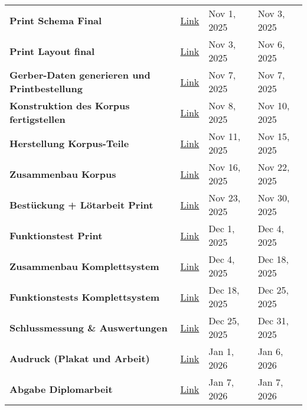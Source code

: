 \begin{table}[!ht]
\begin{tabularx}{388pt}{|l|l|l|l|}
		\textbf{Print Schema Final} & \href{https://github.com/Violabitch5/Nathophone\_elec/issues/8}{Link} & Nov 1, 2025 & Nov 3, 2025 \\ 
		\textbf{Print Layout final} & \href{https://github.com/Violabitch5/Nathophone\_elec/issues/9}{Link} & Nov 3, 2025 & Nov 6, 2025 \\ 
		\textbf{Gerber-Daten generieren und Printbestellung} & \href{https://github.com/Violabitch5/Nathophone\_elec/issues/10}{Link} & Nov 7, 2025 & Nov 7, 2025 \\ 
		\textbf{Konstruktion des Korpus fertigstellen} & \href{https://github.com/Violabitch5/Nathophone\_mech/issues/1}{Link} & Nov 8, 2025 & Nov 10, 2025 \\ 
		\textbf{Herstellung Korpus-Teile} & \href{https://github.com/Violabitch5/Nathophone\_mech/issues/2}{Link} & Nov 11, 2025 & Nov 15, 2025 \\ 
		\textbf{Zusammenbau Korpus} & \href{https://github.com/Violabitch5/Nathophone\_mech/issues/3}{Link} & Nov 16, 2025 & Nov 22, 2025 \\ 
		\textbf{Bestückung + Lötarbeit Print} & \href{https://github.com/Violabitch5/Nathophone\_elec/issues/11}{Link} & Nov 23, 2025 & Nov 30, 2025 \\ 
		\textbf{Funktionstest Print} & \href{https://github.com/Violabitch5/Nathophone\_elec/issues/12}{Link} & Dec 1, 2025 & Dec 4, 2025 \\ 
		\textbf{Zusammenbau Komplettsystem} & \href{https://github.com/Violabitch5/Nathophone\_mech/issues/4}{Link} & Dec 4, 2025 & Dec 18, 2025 \\ 
		\textbf{Funktionstests Komplettsystem} & \href{https://github.com/Violabitch5/Nathophone\_elec/issues/13}{Link} & Dec 18, 2025 & Dec 25, 2025 \\ 
		\textbf{Schlussmessung \& Auswertungen} & \href{https://github.com/Violabitch5/Nathophone\_elec/issues/14}{Link} & Dec 25, 2025 & Dec 31, 2025 \\ 
		\hdashline
		\textbf{Audruck (Plakat und Arbeit)} & \href{https://github.com/Violabitch5/Nathophone\_doc/issues/8}{Link} & Jan 1, 2026 & Jan 6, 2026 \\ 
		\textbf{Abgabe Diplomarbeit} & \href{https://github.com/Violabitch5/Nathophone\_doc/issues/2}{Link} & Jan 7, 2026 & Jan 7, 2026
	\end{tabularx}
	\label{terminplan}
\end{table}